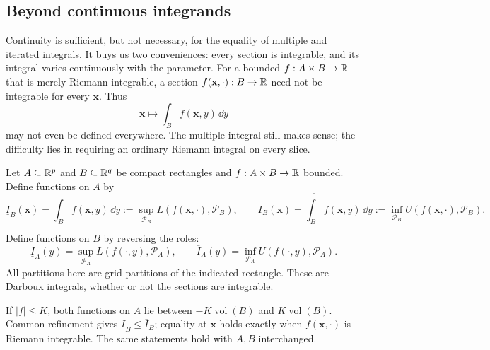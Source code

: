 \subsection{Beyond continuous integrands}
Continuity is sufficient, but not necessary, for the equality of multiple
and iterated integrals. It buys us two conveniences: every section is
integrable, and its integral varies continuously with the parameter.
For a bounded $f:A\times B\to\mathbb{R}$ that is merely Riemann integrable,
a section $f(\mathbf{x},\cdot):B\to\mathbb{R}$ need not be integrable for every $\mathbf{x}$.
Thus
\[
\mathbf{x}\mapsto\int_B f(\mathbf{x},y)\,\dd y
\]
 may not even be defined everywhere.
The multiple integral still makes sense; the difficulty lies in requiring
an ordinary Riemann integral on every slice.

\begin{definition}
\label{def:section-darboux-integrals}
Let $A\subseteq\mathbb{R}^p$ and $B\subseteq\mathbb{R}^q$ be compact rectangles and
$f:A\times B\to\mathbb{R}$ bounded. Define functions on $A$ by
\[
\underline I_B(\mathbf{x})=\underline{\int_B}f(\mathbf{x},y)\,\dd y
 :=\sup_{\mathcal P_B}L(f(\mathbf{x},\cdot),\mathcal P_B),\qquad
\overline I_B(\mathbf{x})=\overline{\int_B}f(\mathbf{x},y)\,\dd y
 :=\inf_{\mathcal P_B}U(f(\mathbf{x},\cdot),\mathcal P_B).
\]
Define functions on $B$ by reversing the roles:
\[
\underline I_A(y)=\sup_{\mathcal P_A}L(f(\cdot,y),\mathcal P_A),\qquad
\overline I_A(y)=\inf_{\mathcal P_A}U(f(\cdot,y),\mathcal P_A).
\]
All partitions here are grid partitions of the indicated rectangle.
These are Darboux integrals, whether or not the sections are integrable.
\end{definition}
If $|f|\leq K$, both functions on $A$ lie between
$-K\operatorname{vol}(B)$ and $K\operatorname{vol}(B)$.
Common refinement gives $\underline I_B\leq\overline I_B$; equality
at $\mathbf{x}$ holds exactly when $f(\mathbf{x},\cdot)$ is Riemann integrable.
The same statements hold with $A,B$ interchanged.

